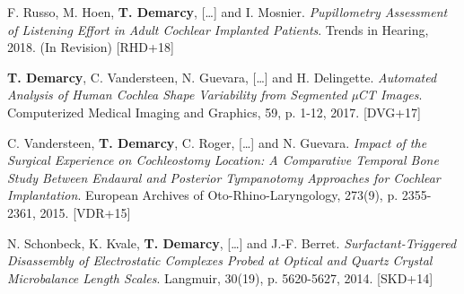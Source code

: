 \begin{cvhonors}
  \cvhonor
    {F. Russo, M. Hoen, \textbf{T. Demarcy}, [\ldots] and I. Mosnier.  \textit{Pupillometry Assessment of Listening Effort in Adult Cochlear Implanted Patients}. Trends in Hearing, 2018. (In Revision)} %
    {\hypertarget{RHD+18}{[RHD+18]}} %

  \cvhonor
    {\textbf{T. Demarcy}, C. Vandersteen, N. Guevara, [\ldots] and H. Delingette.  \textit{Automated Analysis of Human Cochlea Shape Variability from Segmented µCT Images}. Computerized Medical Imaging and Graphics, 59, p. 1-12, 2017.} %
    {\hypertarget{DVG+17}{[DVG+17]}} %
    
  \cvhonor
    {C.  Vandersteen,  \textbf{T. Demarcy},  C.  Roger,  [\ldots]  and  N. Guevara. \textit{Impact of the Surgical Experience on Cochleostomy Location: A Comparative Temporal Bone Study Between Endaural and Posterior Tympanotomy Approaches for Cochlear Implantation}. European Archives of Oto-Rhino-Laryngology, 273(9), p. 2355-2361, 2015.} %
    {\hypertarget{VDR+15}{[VDR+15]}} %
       
  \cvhonor
    {N.  Schonbeck,  K.  Kvale,  \textbf{T.  Demarcy}, [\ldots] and  J.-F.  Berret.   \textit{Surfactant-Triggered  Disassembly of  Electrostatic  Complexes  Probed  at  Optical  and  Quartz  Crystal Microbalance Length Scales}. Langmuir, 30(19), p. 5620-5627, 2014.} %
    {\hypertarget{SKD+14}{[SKD+14]}} %

\end{cvhonors}



